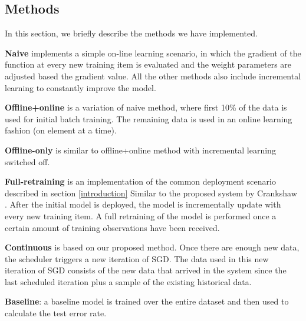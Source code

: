 \documentclass{sig-alternate-05-2015}
\begin{document}
\subsection{Methods}

In this section, we briefly describe the methods we have implemented.

\textbf{Naive} implements a simple on-line learning scenario, in which the gradient of the function at every new training item is evaluated and the weight parameters are adjusted based the gradient value. 
All the other methods also include incremental learning to constantly improve the model.

\textbf{Offline+online} is a variation of naive method, where first 10\% of the data is used for initial batch training.
The remaining data is used in an online learning fashion (on element at a time). 

\textbf{Offline-only} is similar to offline+online method with incremental learning switched off.

\textbf{Full-retraining} is an implementation of the common deployment scenario described in section \ref{introduction}
Similar to the proposed system by Crankshaw \cite{crankshaw2014missing}. 
After the initial model is deployed, the model is incrementally update with every new training item.
A full retraining of the model is performed once a certain amount of training observations have been received.

\textbf{Continuous} is based on our proposed method. 
Once there are enough new data, the scheduler triggers a new iteration of SGD. 
The data used in this new iteration of SGD consists of the new data that arrived in the system since the last scheduled iteration plus a sample of the existing historical data.

\textbf{Baseline}: a baseline model is trained over the entire dataset and then used to calculate the test error rate. 
\end{document}
